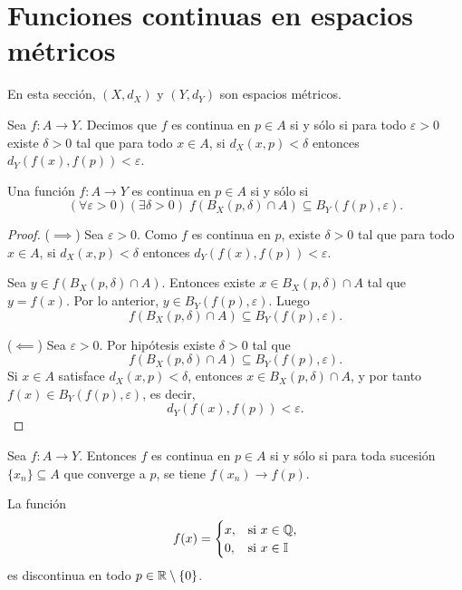 \section{Funciones continuas en espacios métricos}

En esta sección, $(X,d_X)$ y $(Y,d_Y)$ son espacios métricos.

\begin{definicion}
Sea $f:A\to Y$. Decimos que $f$ es continua en $p\in A$ si y sólo si para todo $\varepsilon>0$ existe $\delta>0$ tal que para todo $x\in A$, si $d_X(x,p)<\delta$ entonces $d_Y(f(x),f(p))<\varepsilon$.
\end{definicion}

\begin{definicion}
Una función $f:A\to Y$ es continua en $p\in A$ si y sólo si
\[
(\forall \varepsilon>0)(\exists \delta>0)\; f(B_X(p,\delta)\cap A)\subseteq B_Y(f(p),\varepsilon).
\]
\end{definicion}

\begin{proof}
($\implies$) Sea $\varepsilon>0$. Como $f$ es continua en $p$, existe $\delta>0$ tal que para todo $x\in A$, si $d_X(x,p)<\delta$ entonces $d_Y(f(x),f(p))<\varepsilon$.

Sea $y\in f(B_X(p,\delta)\cap A)$. Entonces existe $x\in B_X(p,\delta)\cap A$ tal que $y=f(x)$. Por lo anterior, $y\in B_Y(f(p),\varepsilon)$. Luego
\[
f(B_X(p,\delta)\cap A)\subseteq B_Y(f(p),\varepsilon).
\]

($\impliedby$) Sea $\varepsilon>0$. Por hipótesis existe $\delta>0$ tal que
\[
f(B_X(p,\delta)\cap A)\subseteq B_Y(f(p),\varepsilon).
\]
Si $x\in A$ satisface $d_X(x,p)<\delta$, entonces $x\in B_X(p,\delta)\cap A$, y por tanto $f(x)\in B_Y(f(p),\varepsilon)$, es decir,
\[
d_Y(f(x),f(p))<\varepsilon.
\]
\end{proof}

\begin{teorema}
Sea $f:A\to Y$. Entonces $f$ es continua en $p\in A$ si y sólo si para toda sucesión $\{x_n\}\subseteq A$ que converge a $p$, se tiene $f(x_n)\to f(p)$.
\end{teorema}

\begin{example}
La función
\[
f(x)=\begin{cases}
x, & \text{si } x\in\mathbb{Q},\\
0, & \text{si } x\in\mathbb{I}
\end{cases}
\]
es discontinua en todo $p\in\mathbb{R}\setminus\{0\}$.
\end{example}

